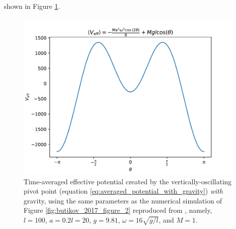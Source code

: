 \documentclass[12pt, letterpaper]{article}
\begin{document}
shown in Figure \ref{fig:ButikovKapitzaVeff_with_Gravity}.
\begin{figure}
    \centering
    \includegraphics[width=0.5\linewidth]{Veff_with_Gravity.pdf}
    \caption{Time-averaged effective potential created by the vertically-oscillating pivot point (equation \ref{eq:averaged_potential_with_gravity}) \emph{with} gravity, using the same parameters as the numerical simulation of Figure \ref{fig:butikov_2017_figure_2} reproduced from \cite{Butikov2017KapitzaS}, namely, $l = 100$, $a = 0.2l = 20$, $g = 9.81$, $\omega = 16\sqrt{g/l}$, and $M = 1$.}
    \label{fig:ButikovKapitzaVeff_with_Gravity}
\end{figure}
\end{document}
